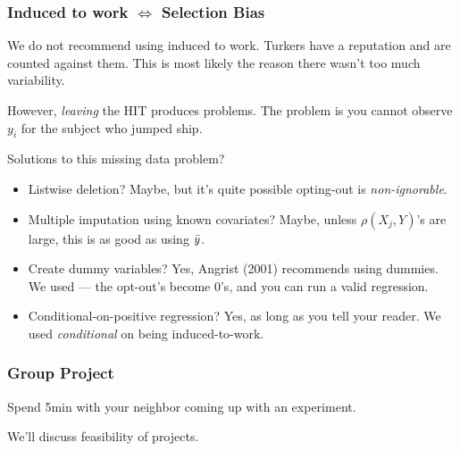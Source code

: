 \documentclass[slides]{beamer} %
\begin{document}
\begin{frame}\frametitle{Induced to work $\Leftrightarrow$ Selection Bias}

\small

We do not recommend using induced to work. Turkers have a reputation and  are counted against them. This is most likely the reason there wasn't too much variability. \\ \pause 

\vspace{0.2cm}

However, \textit{leaving} the HIT produces problems. The problem is you cannot observe $y_i$ for the subject who jumped ship. \\ \pause 

\vspace{0.2cm}

Solutions to this missing data problem? \pause  
\begin{itemize}
\item Listwise deletion? Maybe, but it's quite possible opting-out is \textit{non-ignorable}. \pause 
\item Multiple imputation using known covariates? Maybe, unless $\rho(X_j,Y)$'s are large, this is as good as using $\bar{y}$. \pause 
\item Create dummy variables? Yes, Angrist (2001) recommends using dummies. We used  --- the opt-out's become 0's, and you can run a valid regression. \pause 
\item Conditional-on-positive regression? Yes, as long as you tell your reader. We used  \textit{conditional} on being induced-to-work.
\end{itemize}

\end{frame}

\begin{frame}\frametitle{Group Project}

\centering

Spend 5min with your neighbor coming up with an experiment.


We'll discuss feasibility of projects.

\end{frame}
\end{document}
